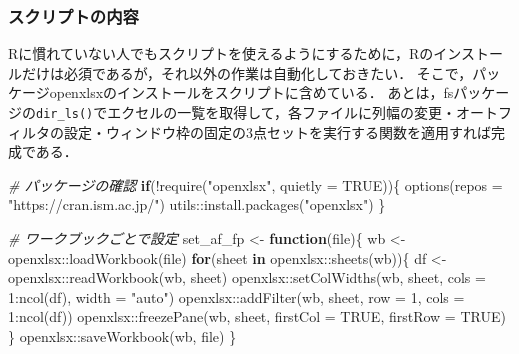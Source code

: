 \documentclass[
]{article}
\newenvironment{Shaded}{\begin{snugshade}}{\end{snugshade}}
\newcommand{\AttributeTok}[1]{\textcolor[rgb]{0.77,0.63,0.00}{#1}}
\newcommand{\CommentTok}[1]{\textcolor[rgb]{0.56,0.35,0.01}{\textit{#1}}}
\newcommand{\ConstantTok}[1]{\textcolor[rgb]{0.00,0.00,0.00}{#1}}
\newcommand{\ControlFlowTok}[1]{\textcolor[rgb]{0.13,0.29,0.53}{\textbf{#1}}}
\newcommand{\DecValTok}[1]{\textcolor[rgb]{0.00,0.00,0.81}{#1}}
\newcommand{\FunctionTok}[1]{\textcolor[rgb]{0.00,0.00,0.00}{#1}}
\newcommand{\NormalTok}[1]{#1}
\newcommand{\OtherTok}[1]{\textcolor[rgb]{0.56,0.35,0.01}{#1}}
\newcommand{\SpecialCharTok}[1]{\textcolor[rgb]{0.00,0.00,0.00}{#1}}
\newcommand{\StringTok}[1]{\textcolor[rgb]{0.31,0.60,0.02}{#1}}
\begin{document}
\hypertarget{ux30b9ux30afux30eaux30d7ux30c8ux306eux5185ux5bb9}{%
\subsubsection{スクリプトの内容}\label{ux30b9ux30afux30eaux30d7ux30c8ux306eux5185ux5bb9}}

Rに慣れていない人でもスクリプトを使えるようにするために，Rのインストールだけは必須であるが，それ以外の作業は自動化しておきたい．
そこで，パッケージopenxlsxのインストールをスクリプトに含めている．
あとは，fsパッケージの\texttt{dir\_ls()}でエクセルの一覧を取得して，各ファイルに列幅の変更・オートフィルタの設定・ウィンドウ枠の固定の3点セットを実行する関数を適用すれば完成である．

\begin{Shaded}
\begin{Highlighting}[]
  \CommentTok{\# パッケージの確認}
\ControlFlowTok{if}\NormalTok{(}\SpecialCharTok{!}\FunctionTok{require}\NormalTok{(}\StringTok{"openxlsx"}\NormalTok{, }\AttributeTok{quietly =} \ConstantTok{TRUE}\NormalTok{))\{}
  \FunctionTok{options}\NormalTok{(}\AttributeTok{repos =} \StringTok{"https://cran.ism.ac.jp/"}\NormalTok{)}
\NormalTok{   utils}\SpecialCharTok{::}\FunctionTok{install.packages}\NormalTok{(}\StringTok{"openxlsx"}\NormalTok{)}
\NormalTok{\}}

  \CommentTok{\# ワークブックごとで設定}
\NormalTok{set\_af\_fp }\OtherTok{\textless{}{-}} \ControlFlowTok{function}\NormalTok{(file)\{}
\NormalTok{  wb }\OtherTok{\textless{}{-}}\NormalTok{ openxlsx}\SpecialCharTok{::}\FunctionTok{loadWorkbook}\NormalTok{(file)}
  \ControlFlowTok{for}\NormalTok{(sheet }\ControlFlowTok{in}\NormalTok{ openxlsx}\SpecialCharTok{::}\FunctionTok{sheets}\NormalTok{(wb))\{}
\NormalTok{    df }\OtherTok{\textless{}{-}}\NormalTok{ openxlsx}\SpecialCharTok{::}\FunctionTok{readWorkbook}\NormalTok{(wb, sheet)}
\NormalTok{    openxlsx}\SpecialCharTok{::}\FunctionTok{setColWidths}\NormalTok{(wb, sheet, }\AttributeTok{cols =} \DecValTok{1}\SpecialCharTok{:}\FunctionTok{ncol}\NormalTok{(df), }\AttributeTok{width =}  \StringTok{"auto"}\NormalTok{)}
\NormalTok{    openxlsx}\SpecialCharTok{::}\FunctionTok{addFilter}\NormalTok{(wb, sheet, }\AttributeTok{row =} \DecValTok{1}\NormalTok{, }\AttributeTok{cols =} \DecValTok{1}\SpecialCharTok{:}\FunctionTok{ncol}\NormalTok{(df))}
\NormalTok{    openxlsx}\SpecialCharTok{::}\FunctionTok{freezePane}\NormalTok{(wb, sheet, }\AttributeTok{firstCol =} \ConstantTok{TRUE}\NormalTok{, }\AttributeTok{firstRow =} \ConstantTok{TRUE}\NormalTok{)}
\NormalTok{  \}}
\NormalTok{  openxlsx}\SpecialCharTok{::}\FunctionTok{saveWorkbook}\NormalTok{(wb, file)}
\NormalTok{\}}


\end{Highlighting}
\end{Shaded}
\end{document}
